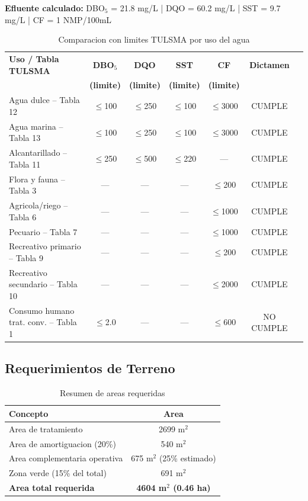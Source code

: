 \documentclass[12pt,a4paper]{article}
\begin{document}
\textbf{Efluente calculado:} DBO$_5$ = 21.8 mg/L | DQO = 60.2 mg/L | SST = 9.7 mg/L | CF = 1 NMP/100mL

\vspace{0.5em}
\begin{table}[H]
\centering
\small
\caption{Comparacion con limites TULSMA por uso del agua}
\begin{tabular}{lcccccc}
\toprule
\textbf{Uso / Tabla TULSMA} & \textbf{DBO$_5$} & \textbf{DQO} & \textbf{SST} & \textbf{CF} & \textbf{Dictamen} \\
& \textbf{(limite)} & \textbf{(limite)} & \textbf{(limite)} & \textbf{(limite)} & \\
\midrule
Agua dulce -- Tabla 12 & $\leq$100 & $\leq$250 & $\leq$100 & $\leq$3000 & CUMPLE \\
Agua marina -- Tabla 13 & $\leq$100 & $\leq$250 & $\leq$100 & $\leq$3000 & CUMPLE \\
Alcantarillado -- Tabla 11 & $\leq$250 & $\leq$500 & $\leq$220 & --- & CUMPLE \\
Flora y fauna -- Tabla 3 & --- & --- & --- & $\leq$200 & CUMPLE \\
Agricola/riego -- Tabla 6 & --- & --- & --- & $\leq$1000 & CUMPLE \\
Pecuario -- Tabla 7 & --- & --- & --- & $\leq$1000 & CUMPLE \\
Recreativo primario -- Tabla 9 & --- & --- & --- & $\leq$200 & CUMPLE \\
Recreativo secundario -- Tabla 10 & --- & --- & --- & $\leq$2000 & CUMPLE \\
Consumo humano trat. conv. -- Tabla 1 & $\leq$2.0 & --- & --- & $\leq$600 & NO CUMPLE \\
\bottomrule
\end{tabular}
\end{table}

\subsection{Requerimientos de Terreno}

\begin{table}[H]
\centering
\caption{Resumen de areas requeridas}
\begin{tabular}{lc}
\toprule
\textbf{Concepto} & \textbf{Area} \\
\midrule
Area de tratamiento & 2699 m$^2$ \\
Area de amortiguacion (20\%) & 540 m$^2$ \\
Area complementaria operativa & 675 m$^2$ (25\% estimado) \\
Zona verde (15\% del total) & 691 m$^2$ \\
\midrule
\textbf{Area total requerida} & \textbf{4604 m$^2$ (0.46 ha)} \\
\bottomrule
\end{tabular}
\end{table}
\end{document}
